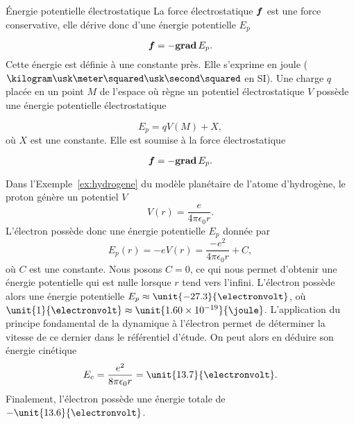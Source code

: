 \begin{defn}{Énergie potentielle électrostatique}
	La force électrostatique $\vecf$ est une force conservative, elle 
	dérive donc d'une énergie potentielle $E_p$

	\begin{equation}
		\vecf = - \gradient E_p.
	\end{equation}
	Cette énergie est définie à une constante
	près. Elle s'exprime en joule ($\kilogram \usk \meter \squared \usk \second
	\squared$ en SI). Une charge $q$ placée en un point $M$ de
	l'espace où règne un potentiel électrostatique $V$ possède une 
	énergie potentielle électrostatique 

	\begin{equation*}
		E_p = q V(M) + X,
	\end{equation*}
	où $X$ est une constante. Elle est soumise à la force électrostatique

	\begin{equation*}
		\vecf = -\gradient E_p.
	\end{equation*}
\end{defn}

\begin{exemple}
	Dans l'Exemple~\ref{ex:hydrogene} du modèle planétaire
	de l'atome d'hydrogène, le proton génère
	un potentiel $V$
	\begin{equation*}
		V(r) = \dfrac{e}{4 \pi \epsilon_0 r}.
	\end{equation*}
	L'électron possède donc une énergie potentielle $E_p$ donnée par
	\begin{equation*}
		E_p(r) = -eV(r) = \dfrac{-e^2}{4 \pi \epsilon_0 r} + C,
	\end{equation*}
	où $C$ est une constante. Nous posons $C = 0$, ce qui nous permet d'obtenir une énergie
	potentielle qui est nulle lorsque $r$ tend vers l'infini. L'électron 
	possède alors une énergie potentielle
	$E_p \approx \unit{-27.3}{\electronvolt}$,
        où $\unit{1}{\electronvolt} \approx \unit{1.60 \times 10^{-19}}{\joule}$.
	L'application du principe fondamental de la dynamique à l'électron permet
	de déterminer la vitesse de ce dernier dans le référentiel d'étude.
	On peut alors en déduire son énergie cinétique
	\begin{equation*}
		E_c = \dfrac{e^2}{8 \pi \epsilon_0 r} = \unit{13.7}{\electronvolt}.
	\end{equation*}
	Finalement, l'électron possède une énergie totale de $-\unit{13.6}{\electronvolt}$.
\end{exemple}

